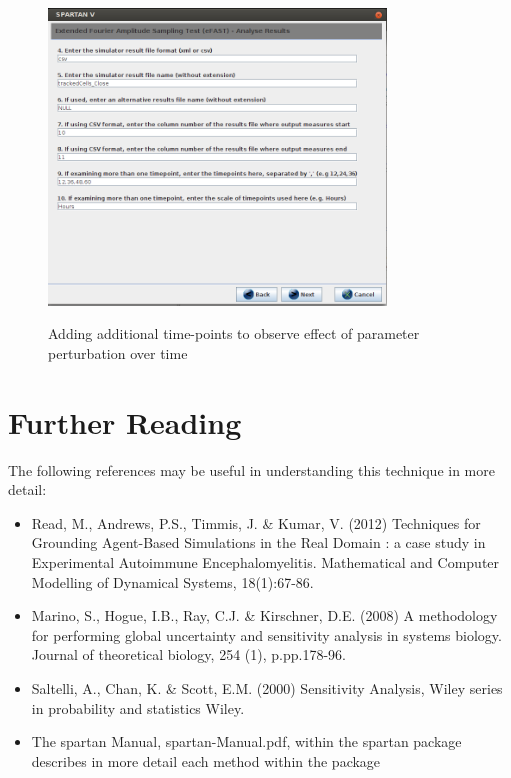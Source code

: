 \documentclass[a4paper,11pt]{article}
\begin{document}
\begin{figure}
\centering
    \includegraphics[width=0.8\textwidth]{SpartanV_eFAST6.png}\\ \noindent
    \caption{Adding additional time-points to observe effect of parameter perturbation over time}
    \label{eFAST_Screen6}
    \newpage 
\end{figure} 

\section{Further Reading}
\noindent
The following references may be useful in understanding this technique in more detail:
\begin{itemize}
\item Read, M., Andrews, P.S., Timmis, J. \& Kumar, V. (2012) Techniques for Grounding Agent-Based Simulations in the Real Domain : a case study in Experimental Autoimmune Encephalomyelitis. Mathematical and Computer Modelling of Dynamical Systems, 18(1):67-86.
\item Marino, S., Hogue, I.B., Ray, C.J. \& Kirschner, D.E. (2008) A methodology for performing global uncertainty and sensitivity analysis in systems biology. Journal of theoretical biology, 254 (1), p.pp.178-96.
\item Saltelli, A., Chan, K. \& Scott, E.M. (2000) Sensitivity Analysis, Wiley series in probability and statistics Wiley.
\item The spartan Manual, spartan-Manual.pdf, within the spartan package describes in more detail each method within the package
\end{itemize}
\end{document}
